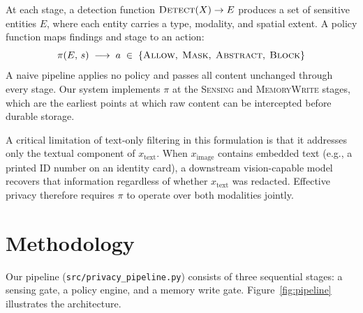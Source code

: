 \documentclass[11pt]{article}
\begin{document}
At each stage, a detection function $\textsc{Detect}(X) \to E$ produces a set of sensitive entities $E$, where each entity carries a type, modality, and spatial extent. A policy function maps findings and stage to an action:
\[
\pi(E,\, s) \;\longrightarrow\; a \;\in\; \{\textsc{Allow},\;\textsc{Mask},\;\textsc{Abstract},\;\textsc{Block}\}
\]
A naive pipeline applies no policy and passes all content unchanged through every stage. Our system implements $\pi$ at the \textsc{Sensing} and \textsc{MemoryWrite} stages, which are the earliest points at which raw content can be intercepted before durable storage.

A critical limitation of text-only filtering in this formulation is that it addresses only the textual component of $x_{\text{text}}$. When $x_{\text{image}}$ contains embedded text (e.g., a printed ID number on an identity card), a downstream vision-capable model recovers that information regardless of whether $x_{\text{text}}$ was redacted. Effective privacy therefore requires $\pi$ to operate over both modalities jointly.

\section{Methodology}

Our pipeline (\texttt{src/privacy\_pipeline.py}) consists of three sequential stages: a sensing gate, a policy engine, and a memory write gate. Figure~\ref{fig:pipeline} illustrates the architecture.
\end{document}
